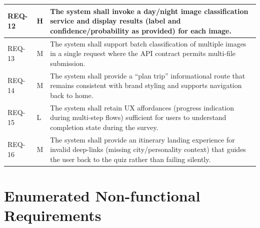 \documentclass[12pt,oneside,openany]{report}
\begin{document}
\begin{longtable}{|p{}|p{}|p{}|}
\hline
REQ-12 & H & The system shall invoke a day/night image classification service and display results (label and confidence/probability as provided) for each image. \\
\hline
REQ-13 & M & The system shall support batch classification of multiple images in a single request where the API contract permits multi-file submission. \\
\hline
REQ-14 & M & The system shall provide a ``plan trip'' informational route that remains consistent with brand styling and supports navigation back to home. \\
\hline
REQ-15 & L & The system shall retain UX affordances (progress indication during multi-step flows) sufficient for users to understand completion state during the survey. \\
\hline
REQ-16 & M & The system shall provide an itinerary landing experience for invalid deep-links (missing city/personality context) that guides the user back to the quiz rather than failing silently. \\
\hline
\end{longtable}

\section{Enumerated Non-functional Requirements}
\end{document}
